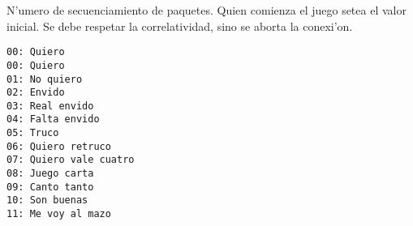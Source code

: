 
N'umero de secuenciamiento de paquetes. Quien comienza el juego setea el valor inicial. Se debe respetar la correlatividad, sino se aborta la conexi'on.


\begin{verbatim}
00: Quiero
00: Quiero
01: No quiero
02: Envido
03: Real envido
04: Falta envido
05: Truco
06: Quiero retruco
07: Quiero vale cuatro
08: Juego carta
09: Canto tanto
10: Son buenas
11: Me voy al mazo
\end{verbatim}
